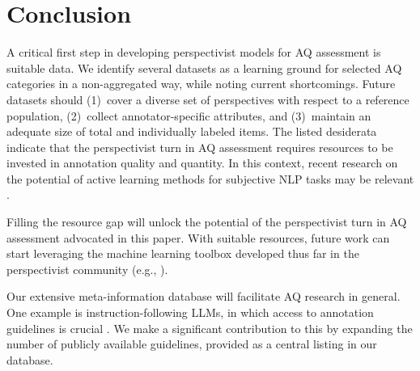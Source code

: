 \section{Conclusion}
\label{sec:conclusion}

A critical first step in developing perspectivist models for AQ assessment is suitable data. We identify several datasets as a learning ground for selected AQ categories in a non-aggregated way, while noting current shortcomings. Future datasets should (1)~{cover a diverse set of perspectives with respect to a reference population}, (2)~{collect annotator-specific attributes}, and (3)~{maintain an adequate size of total and individually labeled items}. The listed desiderata indicate that the perspectivist turn in AQ assessment requires resources to be invested in annotation quality and quantity. In this context, recent research on the potential of active learning methods for subjective NLP tasks may be relevant \cite{wang-plank-2023-actor,van-der-meer-etal-2024-annotator}.

Filling the resource gap will unlock the potential of the perspectivist turn in AQ assessment advocated in this paper. With suitable resources, future work can start leveraging the machine learning toolbox developed thus far in the perspectivist community (e.g., \citealp{davani-etal-2022-dealing,casola-etal-2023-confidence}).

Our extensive meta-information database will facilitate AQ research in general. One example is instruction-following LLMs, in which access to annotation guidelines is crucial \cite{wachsmuth-etal-2024-argument}. We make a significant contribution to this by expanding the number of publicly available guidelines,  provided as a central listing in our database.
